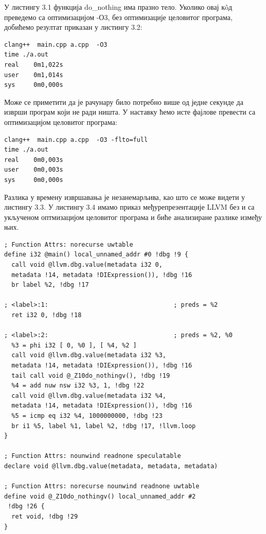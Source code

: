\documentclass[12pt,oneside]{memoir}
\begin{document}
У листингу 3.1  функција  do{\_}nothing има празно тело.
Уколико овај к\^{o}д преведемо са оптимизацијом -О3, без оптимизације целовитог програма, добићемо  резултат приказан у листингу 3.2:

\begin{lstlisting}[frame=single, caption={Rezultat bez optimizacije celovitog programa}, captionpos=b]
clang++  main.cpp a.cpp  -O3
time ./a.out 
real    0m1,022s
user    0m1,014s
sys     0m0,000s
\end{lstlisting}

Може се приметити да је рачунару било потребно више од једне секунде да изврши програм који не ради ништа.
У наставку ћемо исте фајлове превести са оптимизацијом целовитог програма:
\begin{lstlisting}[frame=single, caption={Rezultat sa optimizacijom celovitog programa}, captionpos=b]
clang++  main.cpp a.cpp  -O3 -flto=full
time ./a.out 
real    0m0,003s
user    0m0,003s
sys     0m0,000s
\end{lstlisting}

Разлика у времену извршавања је незанемарљива, као што се може видети у листингу 3.3.
У листингу 3.4 имамо приказ међурепрезентације LLVM  без и са укљученом оптмизацијом целовитог програма
и биће анализиране разлике између њих.
\begin{lstlisting}[frame=single, caption={Međureprezentacija bez optimizacije celovitog programa}, captionpos=b]
; Function Attrs: norecurse uwtable
define i32 @main() local_unnamed_addr #0 !dbg !9 {
  call void @llvm.dbg.value(metadata i32 0, 
  metadata !14, metadata !DIExpression()), !dbg !16
  br label %2, !dbg !17

; <label>:1:                                  ; preds = %2
  ret i32 0, !dbg !18

; <label>:2:                                  ; preds = %2, %0
  %3 = phi i32 [ 0, %0 ], [ %4, %2 ]
  call void @llvm.dbg.value(metadata i32 %3, 
  metadata !14, metadata !DIExpression()), !dbg !16
  tail call void @_Z10do_nothingv(), !dbg !19
  %4 = add nuw nsw i32 %3, 1, !dbg !22
  call void @llvm.dbg.value(metadata i32 %4,
  metadata !14, metadata !DIExpression()), !dbg !16
  %5 = icmp eq i32 %4, 1000000000, !dbg !23
  br i1 %5, label %1, label %2, !dbg !17, !llvm.loop
}

; Function Attrs: nounwind readnone speculatable
declare void @llvm.dbg.value(metadata, metadata, metadata)

; Function Attrs: norecurse nounwind readnone uwtable
define void @_Z10do_nothingv() local_unnamed_addr #2 
 !dbg !26 {
  ret void, !dbg !29
}
\end{lstlisting}
\end{document}

